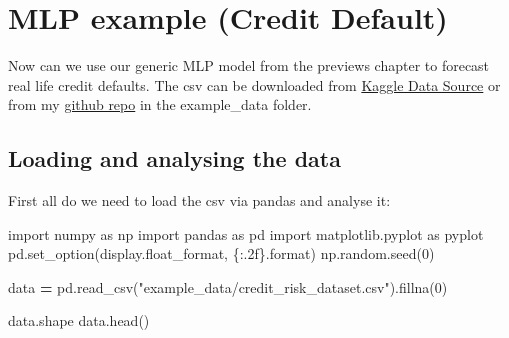 \documentclass[
]{book}
\newenvironment{Shaded}{\begin{snugshade}}{\end{snugshade}}
\newcommand{\BuiltInTok}[1]{#1}
\newcommand{\DecValTok}[1]{\textcolor[rgb]{0.00,0.00,0.81}{#1}}
\newcommand{\ImportTok}[1]{#1}
\newcommand{\NormalTok}[1]{#1}
\newcommand{\OperatorTok}[1]{\textcolor[rgb]{0.81,0.36,0.00}{\textbf{#1}}}
\newcommand{\SpecialCharTok}[1]{\textcolor[rgb]{0.00,0.00,0.00}{#1}}
\newcommand{\StringTok}[1]{\textcolor[rgb]{0.31,0.60,0.02}{#1}}
\begin{document}
\hypertarget{mlp-example-credit-default}{%
\chapter{MLP example (Credit Default)}\label{mlp-example-credit-default}}

Now can we use our generic MLP model from the previews chapter to forecast real life credit defaults. The csv can be downloaded from \href{https://www.kaggle.com/laotse/credit-risk-dataset}{Kaggle Data Source} or from my \href{https://github.com/AxelCode-R/GitBook}{github repo} in the example\_data folder.

\hypertarget{loading-and-analysing-the-data}{%
\section{Loading and analysing the data}\label{loading-and-analysing-the-data}}

First all do we need to load the csv via pandas and analyse it:

\begin{Shaded}
\begin{Highlighting}[]
\ImportTok{import}\NormalTok{ numpy }\ImportTok{as}\NormalTok{ np}
\ImportTok{import}\NormalTok{ pandas }\ImportTok{as}\NormalTok{ pd}
\ImportTok{import}\NormalTok{ matplotlib.pyplot }\ImportTok{as}\NormalTok{ pyplot}
\NormalTok{pd.set\_option(}\StringTok{\textquotesingle{}display.float\_format\textquotesingle{}}\NormalTok{, }\StringTok{\textquotesingle{}}\SpecialCharTok{\{:.2f\}}\StringTok{\textquotesingle{}}\NormalTok{.}\BuiltInTok{format}\NormalTok{)}
\NormalTok{np.random.seed(}\DecValTok{0}\NormalTok{)}

\NormalTok{data }\OperatorTok{=}\NormalTok{ pd.read\_csv(}\StringTok{"example\_data/credit\_risk\_dataset.csv"}\NormalTok{).fillna(}\DecValTok{0}\NormalTok{)}

\NormalTok{data.shape}
\NormalTok{data.head()}
\end{Highlighting}
\end{Shaded}
\end{document}
